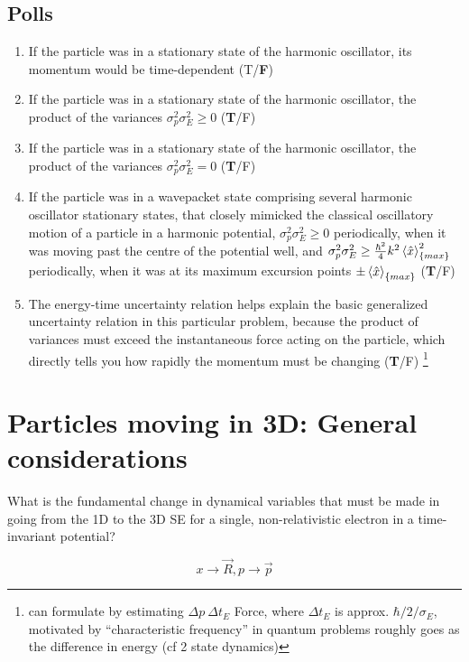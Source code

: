 \documentclass{article}
\begin{document}
\subsection{Polls}

\begin{enumerate}
    \item  If the particle was in a stationary state of the harmonic oscillator, its momentum would be time-dependent (T/\textbf{F})
    \item  If the particle was in a stationary state of the harmonic oscillator, the product of the variances $\sigma_p^2 \sigma_E^2 \geq 0$ (\textbf{T}/F)
    \item  If the particle was in a stationary state of the harmonic oscillator, the product of the variances  $\sigma_p^2 \sigma_E^2 = 0$ (\textbf{T}/F)
    \item If the particle was in a wavepacket state comprising several harmonic oscillator stationary states, that closely mimicked the classical oscillatory motion of a particle in a harmonic potential,  $\sigma_p^2 \sigma_E^2 \geq 0$ periodically, when it was moving past the centre of the potential well, and  $\sigma_p^2 \sigma_E^2 \geq \frac{\hbar^2}{4} k^2 \braket{\hat{x}}^2_{\{max\}}$ periodically, when it was at its maximum excursion points $\pm \braket{\hat{x}}_{\{max\}}$  (\textbf{T}/F)
    \item The energy-time uncertainty relation helps explain the basic generalized uncertainty relation in this particular problem, because the product of variances must exceed the instantaneous force acting on the particle, which directly tells you how rapidly the momentum must be changing (\textbf{T}/F) \footnote{can formulate by estimating $\Delta p~ \Delta t_E$ Force, where $\Delta t_E$ is approx. $\hbar/2/\sigma_E$, motivated by “characteristic frequency” in quantum problems roughly goes as the difference in energy (cf 2 state dynamics)}

\end{enumerate}

\section{Particles moving in 3D: General considerations}

What is the fundamental change in dynamical variables that must be made in going from the 1D to the 3D SE for a single, non-relativistic electron in a time-invariant potential?

$$x \rightarrow \vec{R}, p \rightarrow \vec{p}$$
\end{document}
